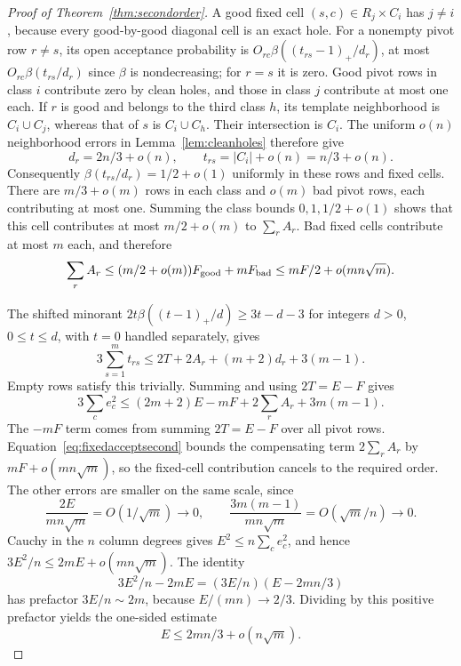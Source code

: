\documentclass[11pt]{article}
\begin{document}
\begin{proof}[Proof of Theorem~\ref{thm:secondorder}]
A good fixed cell $(s,c)\in R_j\times C_i$ has $j\ne i$, because
every good-by-good diagonal cell is an exact hole.
For a nonempty pivot row $r\ne s$, its open acceptance probability is
$O_{rc}\beta((t_{rs}-1)_+/d_r)$, at most
$O_{rc}\beta(t_{rs}/d_r)$ since $\beta$ is nondecreasing; for $r=s$
it is zero. Good pivot rows in
class $i$ contribute zero by clean holes, and those in class $j$
contribute at most one each. If $r$ is good and belongs to the third
class $h$, its template neighborhood is $C_i\cup C_j$, whereas that of
$s$ is $C_i\cup C_h$. Their intersection is $C_i$. The uniform
$o(n)$ neighborhood errors in Lemma~\ref{lem:cleanholes} therefore give
\[
 d_r=2n/3+o(n),\qquad t_{rs}=|C_i|+o(n)=n/3+o(n).
\]
Consequently $\beta(t_{rs}/d_r)=1/2+o(1)$ uniformly in these rows and
fixed cells. There are $m/3+o(m)$ rows in each class and $o(m)$ bad
pivot rows, each contributing at most one. Summing the class bounds
$0,1,1/2+o(1)$ shows that this cell contributes at most
$m/2+o(m)$ to $\sum_r A_r$.
Bad fixed cells contribute at most $m$ each, and therefore
\begin{equation}\label{eq:fixedacceptsecond}
 \sum_r A_r\le(m/2+o(m))F_{\rm good}+mF_{\rm bad}
 \le mF/2+o(mn\sqrt m).
\end{equation}

The shifted minorant
$2t\beta((t-1)_+/d)\ge3t-d-3$ for integers $d>0$,
$0\le t\le d$, with $t=0$ handled separately, gives
\[
 3\sum_{s=1}^m t_{rs}\le2T+2A_r+(m+2)d_r+3(m-1).
\]
Empty rows satisfy this trivially. Summing and using $2T=E-F$ gives
\[
 3\sum_c e_c^2
 \le(2m+2)E-mF+2\sum_r A_r+3m(m-1).
\]
The $-mF$ term comes from summing $2T=E-F$ over all pivot rows.
Equation~\eqref{eq:fixedacceptsecond} bounds the compensating term
$2\sum_r A_r$ by $mF+o(mn\sqrt m)$, so the fixed-cell contribution
cancels to the required order. The other errors are smaller on the same
scale, since
\[
 \frac{2E}{mn\sqrt m}=O(1/\sqrt m)\to0,\qquad
 \frac{3m(m-1)}{mn\sqrt m}=O(\sqrt m/n)\to0.
\]
Cauchy in the $n$ column degrees gives
$E^2\le n\sum_c e_c^2$, and hence
$3E^2/n\le2mE+o(mn\sqrt m)$. The identity
\[
 3E^2/n-2mE=(3E/n)(E-2mn/3)
\]
has prefactor $3E/n\sim2m$, because $E/(mn)\to2/3$.
Dividing by this positive prefactor yields the one-sided estimate
\begin{equation}\label{eq:fullsecondbound}
 E\le2mn/3+o(n\sqrt m).
\end{equation}


\end{proof}
\end{document}
